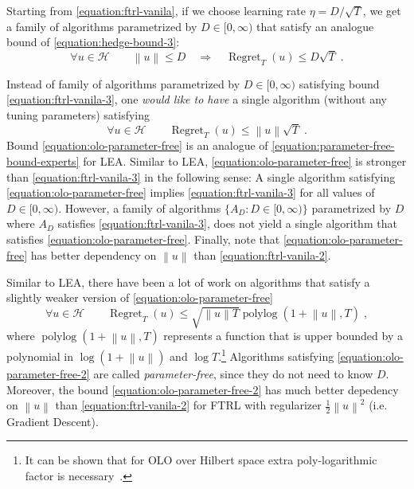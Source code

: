 \documentclass{colt2016} %
\DeclareMathOperator{\Regret}{Regret}
\DeclareMathOperator{\polylog}{polylog}
\renewcommand{\H}{\mathcal{H}}  %
\newcommand{\norm}[1]{\left\|{#1}\right\|}
\begin{document}
Starting from \eqref{equation:ftrl-vanila}, if we choose learning rate $\eta =
D/\sqrt{T}$, we get a family of algorithms parametrized by $D \in [0,\infty)$
that satisfy an analogue bound of \eqref{equation:hedge-bound-3}:
\begin{equation}
\label{equation:ftrl-vanila-3}
\forall u \in \H \qquad \norm{u} \le D \quad  \Longrightarrow \quad \Regret_T(u) \le D \sqrt{T} \; .
\end{equation}

Instead of family of algorithms parametrized by $D \in [0,\infty)$ satisfying
bound \eqref{equation:ftrl-vanila-3}, one \emph{would like
to have} a single algorithm (without any tuning parameters) satisfying
\begin{equation}
\label{equation:olo-parameter-free}
\forall u \in \H \qquad \Regret_T(u) \le \norm{u} \sqrt{T} \; .
\end{equation}
Bound \eqref{equation:olo-parameter-free} is an analogue of
\eqref{equation:parameter-free-bound-experts} for LEA. Similar to LEA,
\eqref{equation:olo-parameter-free} is stronger than
\eqref{equation:ftrl-vanila-3} in the following sense: A single algorithm
satisfying \eqref{equation:olo-parameter-free} implies
\eqref{equation:ftrl-vanila-3} for all values of $D \in [0,\infty)$.
However, a family of algorithms $\{A_D : D \in [0,\infty)\}$ parametrized by $D$
where $A_D$ satisfies \eqref{equation:ftrl-vanila-3}, does not yield
a single algorithm that satisfies \eqref{equation:olo-parameter-free}.
Finally, note that \eqref{equation:olo-parameter-free} has better dependency on $\norm{u}$
than \eqref{equation:ftrl-vanila-2}.

Similar to LEA, there have been a lot of work on algorithms
\citep{Streeter-McMahan-2012, Orabona-2013, McMahan-Abernethy-2013,
McMahan-Orabona-2014} that satisfy a slightly weaker version of
\eqref{equation:olo-parameter-free}
\begin{equation}
\label{equation:olo-parameter-free-2}
\forall u \in \H \qquad \Regret_T(u) \le \sqrt{\norm{u} T} \polylog(1 + \norm{u}, T) \; ,
\end{equation}
where $\polylog(1 + \norm{u}, T)$ represents a function that is upper bounded by
a polynomial in $\log(1+\norm{u})$ and $\log T$.\footnote{It can be
shown that for OLO over Hilbert space extra poly-logarithmic factor is necessary~\cite{McMahan-Abernethy-2013,Orabona-2013}.} 
Algorithms satisfying \eqref{equation:olo-parameter-free-2}
are called \emph{parameter-free}, since they do not need to know $D$.
Moreover, the bound \eqref{equation:olo-parameter-free-2} has much better
depedency on $\norm{u}$ than \eqref{equation:ftrl-vanila-2} for
FTRL with regularizer $\frac{1}{2}\norm{u}^2$ (i.e. Gradient Descent).
\end{document}
